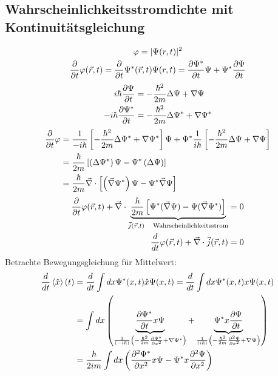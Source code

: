 \subsection{Wahrscheinlichkeitsstromdichte mit Kontinuitätsgleichung} %
\label{sub:Wahrscheinlichkeitsstromdichte_mit_Kontinuitätsgleichung}
\begin{gather*}
     \varphi = \lvert \Psi(r,t)\rvert^2 \\
     \frac{\partial}{\partial t} \varphi(\vec{r},t) = \frac{\partial}{\partial t} \Psi^*(\vec{r},t)
     \Psi(r,t) = \frac{\partial \Psi^*}{\partial t} \Psi + \Psi^* \frac{\partial \Psi}{\partial t}
\end{gather*}
\begin{align*}
    i \hbar \frac{\partial \Psi}{\partial t} 
    &= 
    - \frac{\hbar^2}{2m} \Delta \Psi + \nabla \Psi \\
    - i \hbar \frac{\partial \Psi^*}{\partial t}
    &=
    - \frac{\hbar^2}{2m} \Delta \Psi^* + \nabla \Psi^*
\end{align*}
\begin{align*}
    \frac{\partial}{\partial t} \varphi
    &=
    \frac{1}{-i\hbar} \left[ - \frac{\hbar^2}{2m} \Delta \Psi^* + \nabla \Psi^*\right] \Psi 
    + \Psi^* \frac{1}{i\hbar} \left[ - \frac{\hbar^2}{2m} \Delta \Psi + \nabla
    \Psi \right] \\
    &=
    \frac{\hbar}{2m} \left[ \left( \Delta \Psi^* \right) \Psi - \Psi^* \left( \Delta \Psi
    \right) \right] \\
    &=
    \frac{\hbar}{2m} \vec{\nabla} \cdot \left[ \left( \vec{\nabla} \Psi^* \right) \Psi -
    \Psi^* \vec{\nabla} \Psi \right]
\end{align*}
\begin{align*}
    \frac{\partial}{\partial t} \varphi(\vec{r},t) + \vec{\nabla} \cdot 
    \underbrace{\frac{\hbar}{2m}\left[\Psi^*(\vec{\nabla} \Psi) - \Psi(\vec{\nabla}
    \Psi^*) \right] }_{\vec{j}(\vec{r},t) \quad
    \text{Wahrscheinlichkeitsstrom}}&= 0 \\
    \frac{d }{d t} \varphi(\vec{r},t) + \vec{\nabla} \cdot \vec{j}(\vec{r},t) &= 0
\end{align*}
Betrachte Bewegungsgleichung für Mittelwert:
\begin{align*}
     \frac{d }{dt} \left\langle \hat{x} \right\rangle (t)
     &= \frac{d }{d t} \int dx \Psi^*(x,t) \hat{x} \Psi(x,t)
     = \frac{d }{d t} \int dx  \Psi^*(x,t) x \Psi(x,t) \\
     &=
     \int dx \left( 
     \underbrace{\frac{\partial \Psi^*}{\partial t} x \Psi}_{\frac{1}{ \left( -i \hbar \right) }
     \left( -\frac{\hbar^2}{2m} \frac{\partial \Psi^*}{\partial x^2} + \nabla \Psi^* \right) }
     + 
     \underbrace{\Psi^* x \frac{\partial \Psi}{\partial t}}_{\frac{1}{ \left( i \hbar \right) } 
     \left( -\frac{\hbar^2}{2m} \frac{\partial^2 \Psi}{\partial x^2} + \nabla \Psi \right) }
     \right) \\
     &=
     \frac{\hbar}{2im} \int dx \left( \frac{\partial^2 \Psi^*}{\partial x^2}x \Psi 
     - \Psi^* x \frac{\partial^2 \Psi}{\partial x^2} \right)  \\
\end{align*}
